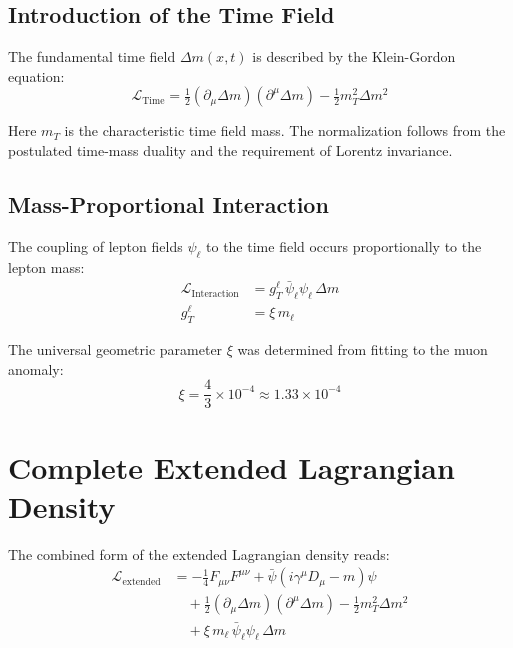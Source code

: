 \documentclass[12pt,a4paper]{article}
\theoremstyle{definition}
\begin{document}
	\subsection{Introduction of the Time Field}
	
	The fundamental time field $\Delta m(x,t)$ is described by the Klein-Gordon equation:
	\begin{equation}
		\mathcal{L}_{\text{Time}} = \tfrac{1}{2}(\partial_\mu \Delta m)(\partial^\mu \Delta m) - \tfrac{1}{2} m_T^2 \Delta m^2
		\label{eq:time_field_lagrangian}
	\end{equation}
	
	Here $m_T$ is the characteristic time field mass. The normalization follows from the postulated time-mass duality and the requirement of Lorentz invariance\cite{pascher_mathematical_structure_2025}.
	
	\subsection{Mass-Proportional Interaction}
	
	The coupling of lepton fields $\psi_\ell$ to the time field occurs proportionally to the lepton mass:
	\begin{align}
		\mathcal{L}_{\text{Interaction}} &= g_T^\ell \, \bar{\psi}_\ell \psi_\ell \, \Delta m \label{eq:interaction_lagrangian}\\
		g_T^\ell &= \xi \, m_\ell \label{eq:coupling_strength}
	\end{align}
	
	The universal geometric parameter $\xi$ was determined from fitting to the muon anomaly:
	\begin{equation}
		\xi = \frac{4}{3} \times 10^{-4} \approx 1.33 \times 10^{-4}
		\label{eq:xi_parameter}
	\end{equation}
	
	\section{Complete Extended Lagrangian Density}
	
	The combined form of the extended Lagrangian density reads:
	\begin{align}
		\mathcal{L}_{\text{extended}} &= -\tfrac{1}{4} F_{\mu\nu}F^{\mu\nu} + \bar{\psi}(i\gamma^\mu D_\mu - m)\psi \nonumber\\
		&\quad + \tfrac{1}{2}(\partial_\mu \Delta m)(\partial^\mu \Delta m) - \tfrac{1}{2} m_T^2 \Delta m^2 \nonumber\\
		&\quad + \xi \, m_\ell \,\bar{\psi}_\ell \psi_\ell \, \Delta m
		\label{eq:extended_lagrangian}
	\end{align}
	
\end{document}

